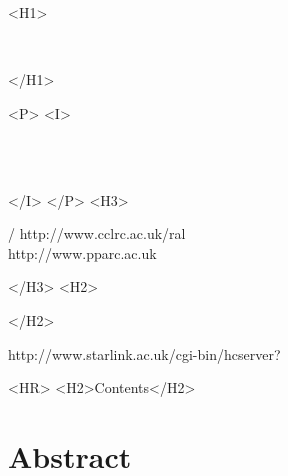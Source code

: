 \begin{htmlonly}
   \xlabel{}
   \begin{rawhtml} <H1> \end{rawhtml}
      \stardoctitle\\
      \stardocmanual
   \begin{rawhtml} </H1> \end{rawhtml}


   \begin{rawhtml} <P> <I> \end{rawhtml}
   \stardoccategory\ \stardocnumber \\
   \stardocauthors \\
   \stardocdate
   \begin{rawhtml} </I> </P> <H3> \end{rawhtml}
       /
                        {http://www.cclrc.ac.uk/ral} \\
                        {http://www.pparc.ac.uk} \\
   \begin{rawhtml} </H3> <H2> \end{rawhtml}
   \begin{rawhtml} </H2> \end{rawhtml}
      {http://www.starlink.ac.uk/cgi-bin/hcserver?\stardocsource}\\

  \label{stardoccontents}
  \begin{rawhtml} 
    <HR>
    <H2>Contents</H2>
  \end{rawhtml}
  \newcommand{\latexonlytoc}[0]{}

  \section{Abstract}
\end{htmlonly}

